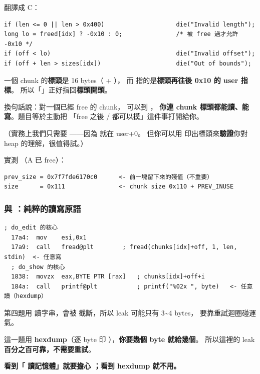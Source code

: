 翻譯成 C：

\begin{lstlisting}[style=c]
if (len <= 0 || len > 0x400)                    die("Invalid length");
long lo = freed[idx] ? -0x10 : 0;               /* 被 free 過才允許 -0x10 */
if (off < lo)                                   die("Invalid offset");
if (off + len > sizes[idx])                     die("Out of bounds");
\end{lstlisting}

\begin{whybox}
一個 chunk 的\textbf{標頭}是 16 bytes（ + ），
而  指的是\textbf{標頭再往後 0x10 的 user 指標}。
所以「」正好指回\textbf{標頭開頭}。

換句話說：對一個已經 free 的 chunk， 可以到 ，
\textbf{你連 chunk 標頭都能讀、能寫}。題目等於主動把
「free 之後 / 都可以摸」這件事打開給你。

（實務上我們只需要 ——因為  就在 user+0。
但你可以用  印出標頭來\textbf{驗證}你對 heap 的理解，很值得試。）
\end{whybox}

實測 （A 已 free）：

\begin{lstlisting}[style=raw]
prev_size = 0x7f7fde6170c0      <- 前一塊留下來的殘值（不重要）
size      = 0x111               <- chunk size 0x110 + PREV_INUSE
\end{lstlisting}

\subsubsection{ 與 ：純粹的讀寫原語}

\begin{lstlisting}[style=asm]
  ; do_edit 的核心
  17a4:  mov    esi,0x1
  17a9:  call   fread@plt        ; fread(chunks[idx]+off, 1, len, stdin)  <- 任意寫
  ; do_show 的核心
  1838:  movzx  eax,BYTE PTR [rax]   ; chunks[idx]+off+i
  184a:  call   printf@plt           ; printf("%02x ", byte)   <- 任意讀（hexdump）
\end{lstlisting}

\begin{keybox}
第四題用  讀字串，會被  截斷，所以 leak 可能只有 3\textasciitilde4 bytes，
要靠重試迴圈碰運氣。

這一題用 \textbf{hexdump}（逐 byte 印 ），\textbf{你要幾個 byte 就給幾個}。
所以這裡的 leak \textbf{百分之百可靠，不需要重試}。

\textbf{看到「 讀記憶體」就要擔心 ；看到 hexdump 就不用。}
\end{keybox}

